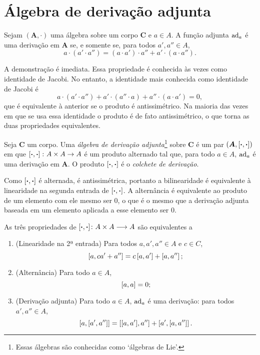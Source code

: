 \section{Álgebra de derivação adjunta}

\begin{proposition}
Sejam $(\bm A,\cdot)$ uma álgebra sobre um corpo $\bm C$ e $a \in A$. A função adjunta $\operatorname{ad}_a$ é uma derivação em $\bm A$ se, e somente se, para todos $a',a'' \in A$,
	\begin{equation*}
	a \cdot (a' \cdot a'') = (a \cdot a') \cdot a'' + a' \cdot (a \cdot a'').
	\end{equation*}
\end{proposition}

A demonstração é imediata. Essa propriedade é conhecida às vezes como identidade de Jacobi. No entanto, a identidade mais conhecida como identidade de Jacobi é
	\begin{equation*}
	a \cdot (a' \cdot a'') + a' \cdot (a'' \cdot a) + a'' \cdot (a \cdot a') = 0,
	\end{equation*}
que é equivalente à anterior se o produto é antissimétrico. Na maioria das vezes em que se usa essa identidade o produto é de fato antissimétrico, o que torna as duas propriedades equivalentes.

\begin{definition}
Seja $\bm C$ um corpo. Uma \emph{álgebra de derivação adjunta}\footnote{Essas álgebras são conhecidas como `álgebras de Lie'.} sobre $\bm C$ é um par $(\bm A,\left[{\bm{\cdot}},{\bm{\cdot}}\right])$ em que $\left[{\bm{\cdot}},{\bm{\cdot}}\right]\colon A \times A \to A$ é um produto alternado tal que, para todo $a \in A$, $\operatorname{ad}_a$ é uma derivação em $\bm A$. O produto $\left[{\bm{\cdot}},{\bm{\cdot}}\right]$ é o \emph{colchete de derivação}.
\end{definition}

Como $\left[{\bm{\cdot}},{\bm{\cdot}}\right]$ é alternada, é antissimétrica, portanto a bilinearidade é equivalente à linearidade na segunda entrada de $\left[{\bm{\cdot}},{\bm{\cdot}}\right]$. A alternância é equivalente ao produto de um elemento com ele mesmo ser $0$, o que é o mesmo que a derivação adjunta baseada em um elemento aplicada a esse elemento ser $0$.

As três propriedades de ${\left[{\bm{\cdot}},{\bm{\cdot}}\right]}\colon {A \times A} \longrightarrow {A}$ são equivalentes a
	\begin{enumerate}
	\item (Linearidade na 2ª entrada) Para todos $a,a',a'' \in A$ e $c \in C$,
		\begin{equation*}
		\left[{a},{ca'+a''}\right] = c\left[{a},{a'}\right] + \left[{a},{a''}\right];
		\end{equation*}
	\item (Alternância) Para todo $a \in A$,
		\begin{equation*}
		\left[{a},{a}\right] = 0;
		\end{equation*}
	\item (Derivação adjunta) Para todo $a \in A$, $\operatorname{ad}_a$ é uma derivação: para todos $a',a'' \in A$,
		\begin{equation*}
		\left[{a},{\left[{a'},{a''}\right]}\right] = \left[{\left[{a},{a'}\right]},{a''}\right] + \left[{a'},{\left[{a},{a''}\right]}\right].
		\end{equation*}
	\end{enumerate}

